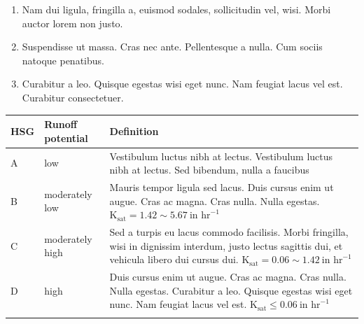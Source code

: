 \pagebreak

\lipsum[5]

\begin{enumerate}[(3)]
\item[(1)] Nam dui ligula, fringilla a, euismod sodales, sollicitudin vel, wisi. Morbi auctor
lorem non justo.

\item[(2)] Suspendisse ut massa. Cras nec ante. Pellentesque a nulla. Cum sociis
natoque penatibus.

\item[(3)] Curabitur a leo. Quisque egestas wisi eget nunc. Nam feugiat lacus vel est.
Curabitur consectetuer.
\end{enumerate}

\lipsum[5]



\lipsum[5]

\begin{table}
{\begin{tabular*}{\textwidth}{@{\extracolsep{\fill}}ll@{\raggedright}p{20pc}@{}}
\dtoprule
HSG & Runoff potential & \multicolumn{1}{l}{Definition} \\
\midrule
A & low & \multicolumn{1}{p{20pc}}{\raggedright Vestibulum luctus nibh at lectus. Vestibulum luctus nibh at lectus. Sed bibendum, nulla a faucibus} \\[6pt]
B & moderately low &
\multicolumn{1}{p{20pc}}{\raggedright Mauris tempor ligula sed lacus. Duis cursus enim ut augue. Cras ac magna. Cras
nulla. Nulla egestas. $\textrm{K}_{\textrm{sat}} = 1.42 \sim 5.67\ \textrm{in\ hr}^{ -1}$} \\[6pt]
C& moderately high&
\multicolumn{1}{p{20pc}}{\raggedright Sed a turpis eu lacus commodo facilisis.
Morbi fringilla, wisi in dignissim interdum, justo lectus sagittis dui, et vehicula libero dui cursus dui. $\textrm{K}_{\textrm{sat}} = 0.06 \sim 1.42\ \textrm{in\ hr}^{-1}$} \\[6pt]
D& high&
\multicolumn{1}{p{20pc}}{\raggedright Duis cursus enim ut augue. Cras ac magna. Cras nulla. Nulla egestas.
Curabitur a leo. Quisque egestas wisi eget nunc. Nam feugiat lacus vel est. $\textrm{K}_{\textrm{sat}} \le 0.06\ \textrm{in\ hr}^{ -1}$} \\
\dbottomrule
\end{tabular*}}
{}
\end{table}

